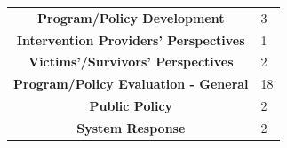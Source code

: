 \documentclass[]{tufte-handout}
\begin{document}
\begin{longtable}[]{@{}cl@{}}
\begin{minipage}[t]{0.56\columnwidth}\centering\strut
\textbf{Program/Policy Development}\strut
\end{minipage} & \begin{minipage}[t]{0.16\columnwidth}\raggedright\strut
3\strut
\end{minipage}\tabularnewline
\begin{minipage}[t]{0.56\columnwidth}\centering\strut
\textbf{Intervention Providers' Perspectives}\strut
\end{minipage} & \begin{minipage}[t]{0.16\columnwidth}\raggedright\strut
1\strut
\end{minipage}\tabularnewline
\begin{minipage}[t]{0.56\columnwidth}\centering\strut
\textbf{Victims'/Survivors' Perspectives}\strut
\end{minipage} & \begin{minipage}[t]{0.16\columnwidth}\raggedright\strut
2\strut
\end{minipage}\tabularnewline
\begin{minipage}[t]{0.56\columnwidth}\centering\strut
\textbf{Program/Policy Evaluation - General}\strut
\end{minipage} & \begin{minipage}[t]{0.16\columnwidth}\raggedright\strut
18\strut
\end{minipage}\tabularnewline
\begin{minipage}[t]{0.56\columnwidth}\centering\strut
\textbf{Public Policy}\strut
\end{minipage} & \begin{minipage}[t]{0.16\columnwidth}\raggedright\strut
2\strut
\end{minipage}\tabularnewline
\begin{minipage}[t]{0.56\columnwidth}\centering\strut
\textbf{System Response}\strut
\end{minipage} & \begin{minipage}[t]{0.16\columnwidth}\raggedright\strut
2\strut
\end{minipage}\tabularnewline
\bottomrule
\end{longtable}
\end{document}
